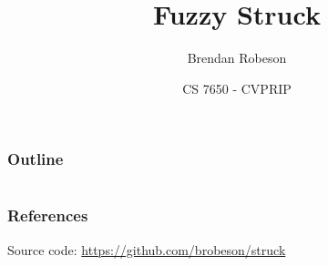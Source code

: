 \documentclass[mathserif,aspectratio=169]{beamer}
\title{Fuzzy Struck}
\author{Brendan Robeson}
\date[CS 7650]{CS 7650 - CVPRIP}
\institute{Utah State University}
\begin{document}
\begin{frame}
    \titlepage
\end{frame}

\begin{frame}
    \frametitle{Outline}
    \tableofcontents
\end{frame}






%

\section{}
\begin{frame}[allowframebreaks]
    \frametitle{References}
    
    

    Source code: \url{https://github.com/brobeson/struck}
\end{frame}
\end{document}
